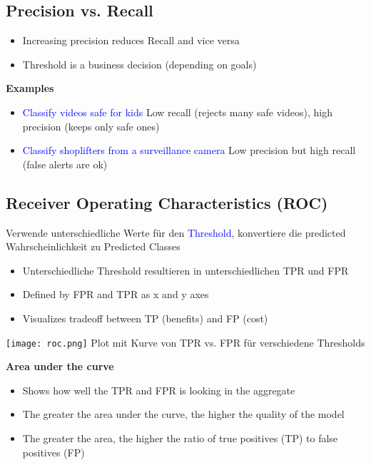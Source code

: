 \subsection{Precision vs. Recall}
\begin{itemize}
    \item Increasing precision reduces Recall and vice versa
    \item Threshold is a business decision (depending on goals)
\end{itemize}
\vspace{10pt}
\textbf{Examples}
\begin{itemize}
    \item \textcolor{blue}{Classify videos safe for kids} Low recall (rejects many safe videos), high precision (keeps only safe ones)
    \item \textcolor{blue}{Classify shoplifters from a surveillance camera} Low precision but high recall (false alerts are ok)
\end{itemize}

\subsection{Receiver Operating Characteristics (ROC)}
Verwende unterschiedliche Werte für den \textcolor{blue}{Threshold}, konvertiere die predicted Wahrscheinlichkeit zu Predicted Classes \\

\begin{itemize}
    \item Unterschiedliche Threshold resultieren in unterschiedlichen TPR und FPR
    \item Defined by FPR and TPR as x and y axes
    \item Visualizes tradeoff between TP (benefits) and FP (cost)
\end{itemize}
\begin{center}
    \texttt{[image: roc.png]}
    Plot mit Kurve von TPR vs. FPR für verschiedene Thresholds
\end{center}
\vspace{10pt}
\textbf{Area under the curve}
\begin{itemize}
    \item Shows how well the TPR and FPR is looking in the aggregate
    \item The greater the area under the curve, the higher the quality of the model
    \item The greater the area, the higher the ratio of true positives (TP) to false positives (FP)
\end{itemize}
